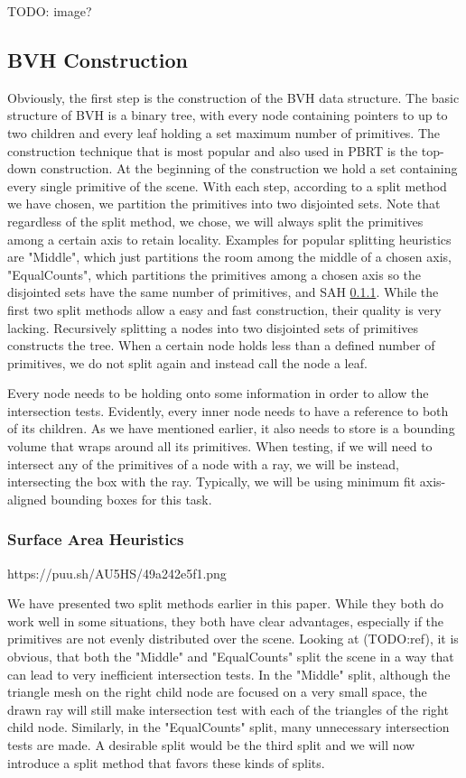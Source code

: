 TODO: image?

\subsection{BVH Construction}

Obviously, the first step is the construction of the BVH data structure. The basic structure of BVH is a binary tree, with every node containing pointers to up to two children and every leaf holding a set maximum number of primitives. The construction technique that is most popular and also used in PBRT is the top-down construction. At the beginning of the construction we hold a set containing every single primitive of the scene. With each step, according to a split method we have chosen, we partition the primitives into two disjointed sets. Note that regardless of the split method, we chose, we will always split the primitives among a certain axis to retain locality. Examples for popular splitting heuristics are "Middle", which just partitions the room among the middle of a chosen axis, "EqualCounts", which partitions the primitives among a chosen axis so the disjointed sets have the same number of primitives, and SAH \ref{pre:sah}. While the first two split methods allow a easy and fast construction, their quality is very lacking. Recursively splitting a nodes into two disjointed sets of primitives constructs the tree. When a certain node holds less than a defined number of primitives, we do not split again and instead call the node a leaf.

Every node needs to be holding onto some information in order to allow the intersection tests. Evidently, every inner node needs to have a reference to both of its children. As we have mentioned earlier, it also needs to store is a bounding volume that wraps around all its primitives. When testing, if we will need to intersect any of the primitives of a node with a ray, we will be instead, intersecting the box with the ray. Typically, we will be using minimum fit axis-aligned bounding boxes for this task.

\subsubsection{Surface Area Heuristics}
\label{pre:sah}

https://puu.sh/AU5HS/49a242e5f1.png

We have presented two split methods earlier in this paper. While they both do work well in some situations, they both have clear advantages, especially if the primitives are not evenly distributed over the scene. Looking at (TODO:ref), it is obvious, that both the "Middle" and "EqualCounts" split the scene in a way that can lead to very inefficient intersection tests. In the "Middle" split, although the triangle mesh on the right child node are focused on a very small space, the drawn ray will still make intersection test with each of the triangles of the right child node. Similarly, in the "EqualCounts" split, many unnecessary intersection tests are made. A desirable split would be the third split and we will now introduce a split method that favors these kinds of splits.

